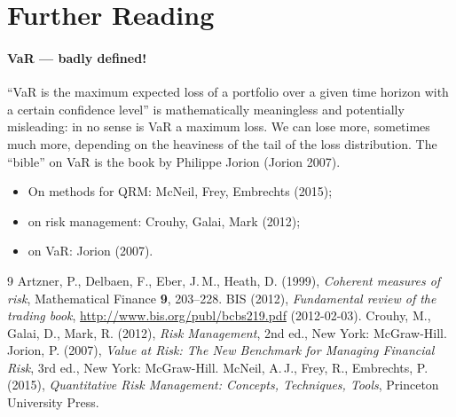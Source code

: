 \documentclass[11pt,a4paper]{article}
\begin{document}
\section{Further Reading}

\paragraph{VaR --- badly defined!} ``VaR is the maximum expected loss of a portfolio over a given time
horizon with a certain confidence level'' is mathematically meaningless and potentially misleading:
in no sense is VaR a maximum loss. We can lose more, sometimes much more, depending on the heaviness
of the tail of the loss distribution. The ``bible'' on VaR is the book by Philippe Jorion
(Jorion 2007).

\begin{itemize}[nosep]
  \item On methods for QRM: McNeil, Frey, Embrechts (2015);
  \item on risk management: Crouhy, Galai, Mark (2012);
  \item on VaR: Jorion (2007).
\end{itemize}

\begin{thebibliography}{9}
 Artzner, P., Delbaen, F., Eber, J.\,M., Heath, D. (1999),
  \emph{Coherent measures of risk}, Mathematical Finance \textbf{9}, 203--228.
 BIS (2012), \emph{Fundamental review of the trading book},
  \url{http://www.bis.org/publ/bcbs219.pdf} (2012-02-03).
 Crouhy, M., Galai, D., Mark, R. (2012), \emph{Risk Management}, 2nd ed.,
  New York: McGraw-Hill.
 Jorion, P. (2007), \emph{Value at Risk: The New Benchmark for Managing
  Financial Risk}, 3rd ed., New York: McGraw-Hill.
 McNeil, A.\,J., Frey, R., Embrechts, P. (2015), \emph{Quantitative Risk
  Management: Concepts, Techniques, Tools}, Princeton University Press.
\end{thebibliography}
\end{document}
